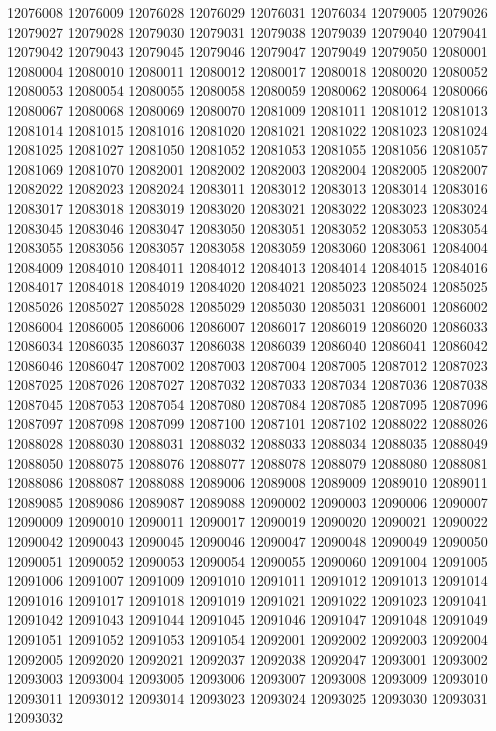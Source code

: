 \documentclass[12pt]{article}
\begin{document}
12076008
12076009
12076028
12076029
12076031
12076034
12079005
12079026
12079027
12079028
12079030
12079031
12079038
12079039
12079040
12079041
12079042
12079043
12079045
12079046
12079047
12079049
12079050
12080001
12080004
12080010
12080011
12080012
12080017
12080018
12080020
12080052
12080053
12080054
12080055
12080058
12080059
12080062
12080064
12080066
12080067
12080068
12080069
12080070
12081009
12081011
12081012
12081013
12081014
12081015
12081016
12081020
12081021
12081022
12081023
12081024
12081025
12081027
12081050
12081052
12081053
12081055
12081056
12081057
12081069
12081070
12082001
12082002
12082003
12082004
12082005
12082007
12082022
12082023
12082024
12083011
12083012
12083013
12083014
12083016
12083017
12083018
12083019
12083020
12083021
12083022
12083023
12083024
12083045
12083046
12083047
12083050
12083051
12083052
12083053
12083054
12083055
12083056
12083057
12083058
12083059
12083060
12083061
12084004
12084009
12084010
12084011
12084012
12084013
12084014
12084015
12084016
12084017
12084018
12084019
12084020
12084021
12085023
12085024
12085025
12085026
12085027
12085028
12085029
12085030
12085031
12086001
12086002
12086004
12086005
12086006
12086007
12086017
12086019
12086020
12086033
12086034
12086035
12086037
12086038
12086039
12086040
12086041
12086042
12086046
12086047
12087002
12087003
12087004
12087005
12087012
12087023
12087025
12087026
12087027
12087032
12087033
12087034
12087036
12087038
12087045
12087053
12087054
12087080
12087084
12087085
12087095
12087096
12087097
12087098
12087099
12087100
12087101
12087102
12088022
12088026
12088028
12088030
12088031
12088032
12088033
12088034
12088035
12088049
12088050
12088075
12088076
12088077
12088078
12088079
12088080
12088081
12088086
12088087
12088088
12089006
12089008
12089009
12089010
12089011
12089085
12089086
12089087
12089088
12090002
12090003
12090006
12090007
12090009
12090010
12090011
12090017
12090019
12090020
12090021
12090022
12090042
12090043
12090045
12090046
12090047
12090048
12090049
12090050
12090051
12090052
12090053
12090054
12090055
12090060
12091004
12091005
12091006
12091007
12091009
12091010
12091011
12091012
12091013
12091014
12091016
12091017
12091018
12091019
12091021
12091022
12091023
12091041
12091042
12091043
12091044
12091045
12091046
12091047
12091048
12091049
12091051
12091052
12091053
12091054
12092001
12092002
12092003
12092004
12092005
12092020
12092021
12092037
12092038
12092047
12093001
12093002
12093003
12093004
12093005
12093006
12093007
12093008
12093009
12093010
12093011
12093012
12093014
12093023
12093024
12093025
12093030
12093031
12093032
\end{document}
